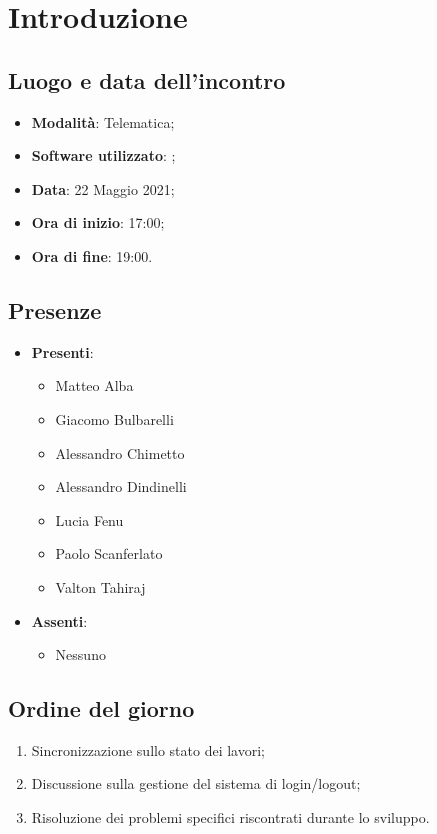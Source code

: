 \documentclass[]{article}
\begin{document}
	

	\newpage


		\section{Introduzione}
		\subsection{Luogo e data dell'incontro}
		\begin{itemize}
			\item \textbf{Modalità}: Telematica;
			\item \textbf{Software utilizzato}: ;
			\item \textbf{Data}: 22 Maggio 2021;
			\item \textbf{Ora di inizio}: 17:00;
			\item \textbf{Ora di fine}: 19:00.
		\end{itemize}

		\subsection{Presenze}
		\begin{itemize}
			\item \textbf{Presenti}:
			\begin{itemize}
				\item Matteo Alba
				\item Giacomo Bulbarelli
				\item Alessandro Chimetto
				\item Alessandro Dindinelli
				\item Lucia Fenu
				\item Paolo Scanferlato
				\item Valton Tahiraj
			\end{itemize}
			\item \textbf{Assenti}:
			\begin{itemize}
				\item Nessuno
			\end{itemize}
		\end{itemize}


		\subsection{Ordine del giorno}
		\begin{enumerate}
			\item Sincronizzazione sullo stato dei lavori;
			\item Discussione sulla gestione del sistema di login/logout;
			\item Risoluzione dei problemi specifici riscontrati durante lo sviluppo.
		\end{enumerate}
\end{document}
